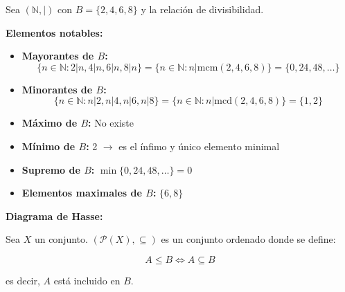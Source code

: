 \documentclass[a4paper,12pt]{article}
\begin{document}
\begin{ejemplo}[title=Ejemplo 2: Orden por Divisibilidad]
Sea \((\mathbb{N}, |)\) con \(B = \{2,4,6,8\}\) y la relación de divisibilidad.

\textbf{Elementos notables:}
\begin{itemize}
    \item \textbf{Mayorantes de \(B\):} 
    \[
    \{ n \in \mathbb{N} : 2|n, 4|n, 6|n, 8|n \} = \{ n \in \mathbb{N} : n | \text{mcm}(2,4,6,8) \} = \{0,24,48,\dots\}
    \]
    \item \textbf{Minorantes de \(B\):} 
    \[
    \{ n \in \mathbb{N} : n|2, n|4, n|6, n|8 \} = \{ n \in \mathbb{N} : n|\text{mcd}(2,4,6,8) \} = \{1,2\}
    \]
    \item \textbf{Máximo de \(B\):} No existe
    \item \textbf{Mínimo de \(B\):} 2 \(\rightarrow\) es el ínfimo y único elemento minimal
    \item \textbf{Supremo de \(B\):} \(\min\{0,24,48,\dots\} = 0\)
    \item \textbf{Elementos maximales de \(B\):} \(\{6,8\}\)
\end{itemize}

\textbf{Diagrama de Hasse:}

\begin{center}
\end{center}
\end{ejemplo}

\begin{procedimiento}[title=Relación de Inclusión en \(\mathcal{P}(X)\)]
Sea \(X\) un conjunto.  
\((\mathcal{P}(X), \subseteq)\) es un conjunto ordenado donde se define:

\[
A \le B \iff A \subseteq B
\]

es decir, \(A\) está incluido en \(B\).
\end{procedimiento}
\end{document}
